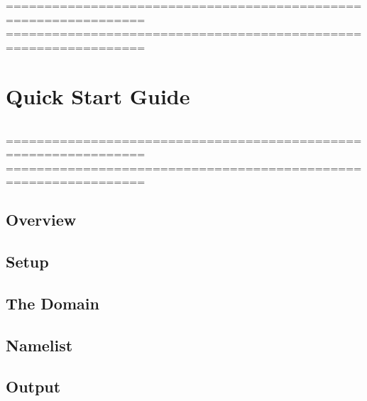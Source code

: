 %
================================================================
%
================================================================
\chapter{Quick Start Guide }
\label{qs}

$\ $\newline    %



%
\noindent ================================================================
%
================================================================

\section{Overview}

\section{Setup}
\label{dom}

\section{The Domain}
\label{dom}

\section{Namelist}
\label{nam}

\section{Output}
\label{nam}




